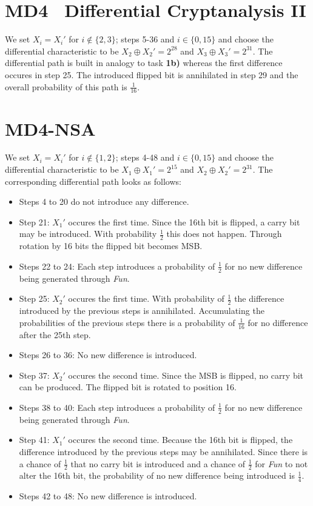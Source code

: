\section{MD4 \textendash\ Differential Cryptanalysis II}
We set $X_i = X_i'$ for $i \notin \{2,3\}$; steps 5-36 and $i \in \{0,15\}$ and choose the differential characteristic to be $X_2 \oplus X_2' = 2^{28}$ and $X_3 \oplus X_3' = 2^{31}$. The differential path is built in analogy to task \textbf{1b)} whereas the first difference occures in step 25. The introduced flipped bit is annihilated in step 29 and the overall probability of this path is $\frac{1}{16}$.

\newpage

\section{MD4-NSA}
We set $X_i = X_i'$ for $i \notin \{1,2\}$; steps 4-48 and $i \in \{0,15\}$ and choose the differential characteristic to be $X_1 \oplus X_1' = 2^{15}$ and $X_2 \oplus X_2' = 2^{31}$. The corresponding differential path looks as follows:

\begin{itemize}
\item Steps 4 to 20 do not introduce any difference.
\item Step 21: $X_1'$ occures the first time. Since the 16th bit is flipped, a carry bit may be introduced. With probability $\frac{1}{2}$ this does not happen. Through rotation by 16 bits the flipped bit becomes MSB.
\item Steps 22 to 24: Each step introduces a probability of $\frac{1}{2}$ for no new difference being generated through \textit{Fun}.
\item Step 25: $X_2'$ occures the first time. With probability of $\frac{1}{2}$ the difference introduced by the previous steps is annihilated. Accumulating the probabilities of the previous steps there is a probability of $\frac{1}{16}$ for no difference after the 25th step.
\item Steps 26 to 36: No new difference is introduced.
\item Step 37: $X_2'$ occures the second time. Since the MSB is flipped, no carry bit can be produced. The flipped bit is rotated to position 16.
\item Steps 38 to 40: Each step introduces a probability of $\frac{1}{2}$ for no new difference being generated through \textit{Fun}.
\item Step 41: $X_1'$ occures the second time. Because the 16th bit is flipped, the difference introduced by the previous steps may be annihilated. Since there is a chance of $\frac{1}{2}$ that no carry bit is introduced and a chance of $\frac{1}{2}$ for \textit{Fun} to not alter the 16th bit, the probability of no new difference being introduced is $\frac{1}{4}$.
\item Steps 42 to 48: No new difference is introduced.

\end{itemize}

